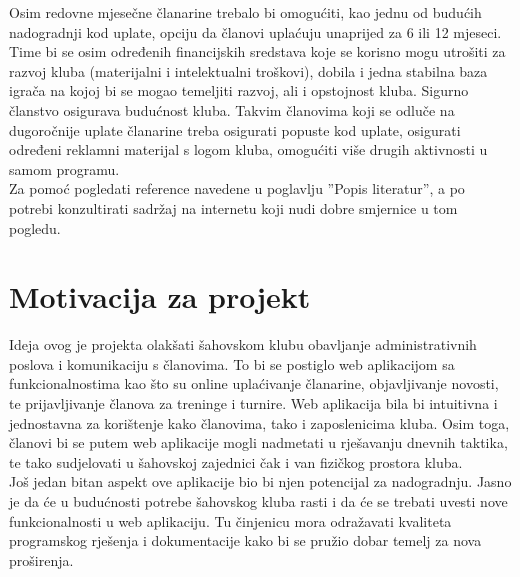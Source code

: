 		Osim redovne mjesečne članarine trebalo bi omogućiti, kao jednu od budućih nadogradnji kod uplate, opciju da članovi uplaćuju unaprijed za 6 ili 12 mjeseci. Time bi se osim određenih financijskih sredstava koje se korisno mogu utrošiti za razvoj kluba (materijalni i intelektualni troškovi), dobila i jedna stabilna baza igrača na kojoj bi se mogao temeljiti razvoj, ali i opstojnost kluba. Sigurno članstvo osigurava budućnost kluba. Takvim članovima koji se odluče na dugoročnije uplate članarine treba osigurati popuste kod uplate, osigurati određeni reklamni materijal s logom kluba, omogućiti više drugih aktivnosti u samom programu.\\
	    Za pomoć pogledati reference navedene u poglavlju ''Popis literatur'', a po potrebi konzultirati sadržaj na internetu koji nudi dobre smjernice u tom pogledu.
		
		\section{Motivacija za projekt}
		Ideja ovog je projekta olakšati šahovskom klubu obavljanje administrativnih poslova i komunikaciju s članovima. To bi se postiglo web aplikacijom sa funkcionalnostima kao što su online uplaćivanje članarine, objavljivanje novosti, te prijavljivanje članova za treninge i turnire. Web aplikacija bila bi intuitivna i jednostavna za korištenje kako članovima, tako i zaposlenicima kluba. Osim toga, članovi bi se putem web aplikacije mogli nadmetati u rješavanju dnevnih taktika, te tako sudjelovati u šahovskoj zajednici čak i van fizičkog prostora kluba.  \\
Još jedan bitan aspekt ove aplikacije bio bi njen potencijal za nadogradnju. Jasno je da će u budućnosti potrebe šahovskog kluba rasti i da će se trebati uvesti nove funkcionalnosti u web aplikaciju. Tu činjenicu mora odražavati kvaliteta programskog rješenja i dokumentacije kako bi se pružio dobar temelj za nova proširenja.
		
		\eject

		
	